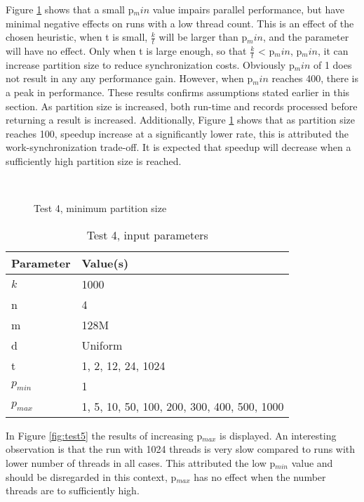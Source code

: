 Figure \ref{fig:test4} shows that a small p$_min$ value impairs
parallel performance, but have minimal negative effects on runs with a
low thread count. This is an effect of the chosen heuristic, when t is
small, $\frac{k}{t}$ will be larger than p$_min$, and the parameter will have no
effect. Only when t is large enough, so that $\frac{k}{t}$ < p$_min$, p$_min$,
it can increase partition size to reduce synchronization costs.
Obviously p$_min$ of 1 does not result in any any performance gain.
However, when p$_min$ reaches 400, there is a peak in performance.
These results confirms assumptions stated earlier in this section. As
partition size is increased, both run-time and records processed
before returning a result is increased. Additionally, Figure
\ref{fig:test4} shows that as partition size reaches 100, speedup
increase at a significantly lower rate, this is attributed the
work-synchronization trade-off. It is expected that speedup will
decrease when a sufficiently high partition size is reached.

\begin{figure}[H]
	\centering
	 \qquad
	 \\
	 \qquad
	\caption{Test 4, minimum partition size}
	\label{fig:test4}
\end{figure}

\begin{table}[H]
	\centering
	\begin{tabular}{|l|l|}
	\hline
	Parameter & Value(s) \\ \hline
	$k$ & 1000 \\
	n & 4\\
	m & 128M\\
	d & Uniform\\
	t & 1, 2, 12, 24, 1024\\
	$p_{min}$ & 1\\
	$p_{max}$ & 1, 5, 10, 50, 100, 200, 300, 400, 500, 1000 \\
	\hline
	\end{tabular}
	\caption{Test 4, input parameters}
	\label{tab:test5-params}
\end{table}

In Figure \ref{fig:test5} the results of increasing p$_{max}$ is
displayed. An interesting observation is that the run with 1024
threads is very slow compared to runs with lower number of threads in
all cases. This attributed the low p$_{min}$ value and should be
disregarded in this context, p$_{max}$ has no effect when the number
threads are to sufficiently high. 

